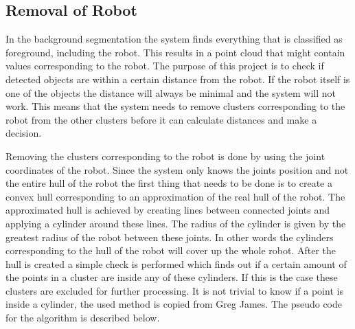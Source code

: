 \subsection{Removal of Robot}

In the background segmentation the system finds everything that is classified as foreground, including the robot. This results in a point cloud that might contain values corresponding to the robot. The purpose of this project is to check if detected objects are within a certain distance from the robot. If the robot itself is one of the objects the distance will always be minimal and the system will not work. This means that the system needs to remove clusters corresponding to the robot from the other clusters before it can calculate distances and make a decision. 

Removing the clusters corresponding to the robot is done by using the joint coordinates of the robot. Since the system only knows the joints position and not the entire hull of the robot the first thing that needs to be done is to create a convex hull corresponding to an approximation of the real hull of the robot. The approximated hull is achieved by creating lines between connected joints and applying a cylinder around these lines. The radius of the cylinder is given by the greatest radius of the robot between these joints. In other words the cylinders corresponding to the hull of the robot will cover up the whole robot. After the hull is created a simple check is performed which finds out if a certain amount of the points in a cluster are inside any of these cylinders. If this is the case these clusters are excluded for further processing. It is not trivial to know if a point is inside a cylinder, the used method is copied from Greg James. \cite{cylinder} The pseudo code for the algorithm is described below.


